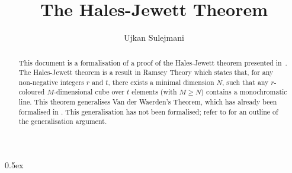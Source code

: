 \documentclass[11pt,a4paper]{article}
\begin{document}
\title{The Hales-Jewett Theorem}
\author{Ujkan Sulejmani}
\maketitle

\begin{abstract}
    This document is a formalisation of a proof of the Hales-Jewett theorem presented in~\cite{thebook}.
    The Hales-Jewett theorem is a result in Ramsey Theory which states that, for any non-negative integers $r$ and $t$, there exists a minimal dimension $N$, such that any $r$-coloured $M$-dimensional cube over $t$ elements (with $M \geq N$) contains a monochromatic line. This theorem generalises Van der Waerden's Theorem, which has already been formalised in \cite{vdw}. This generalisation has not been formalised; refer to \cite{thebook} for an outline of the generalisation argument.
\end{abstract}


\newpage
\tableofcontents

\parindent 0pt\parskip 0.5ex



\nocite{vdw}


\end{document}

